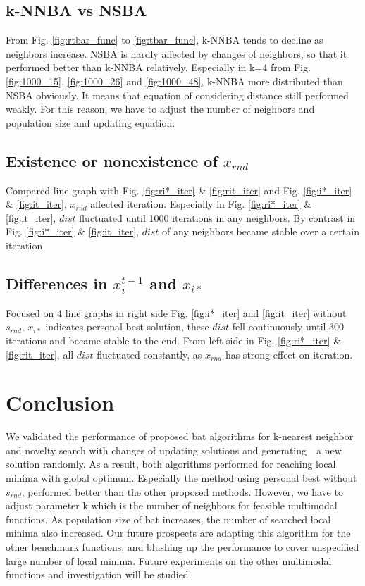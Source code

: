 \documentclass{ies2018}
\begin{document}
\subsection{k-NNBA vs NSBA}
From Fig. \ref{fig:rtbar_func} to \ref{fig:tbar_func}, k-NNBA tends to decline as neighbors increase. NSBA is hardly affected by changes of neighbors, so that it performed better than k-NNBA relatively. Especially in k=4 from Fig. \ref{fig:1000_15}, \ref{fig:1000_26} and \ref{fig:1000_48}, k-NNBA more distributed than NSBA obviously. It means that equation of considering distance still performed weakly. For this reason, we have to adjust the number of neighbors and population size and updating equation.
  
\subsection{Existence or nonexistence of ${x_{rnd}}$}
Compared line graph with Fig. \ref{fig:ri*_iter} \& \ref{fig:rit_iter} and Fig. \ref{fig:i*_iter} \& \ref{fig:it_iter}, ${x_{rnd}}$ affected iteration. Especially in Fig. \ref{fig:ri*_iter} \& \ref{fig:it_iter}, ${dist}$ fluctuated until 1000 iterations in any neighbors. By contrast in Fig. \ref{fig:i*_iter} \& \ref{fig:it_iter}, ${dist}$ of any neighbors became stable over a certain iteration. 

\subsection{Differences in ${x_i^{t-1}}$ and ${x_{i*}}$}
Focused on 4 line graphs in right side Fig. \ref{fig:i*_iter} and \ref{fig:it_iter} without ${s_{rnd}}$, ${x_{i*}}$ indicates personal best solution, these ${dist}$ fell continuously until 300 iterations and became stable to the end. From left side in Fig. \ref{fig:ri*_iter} \& \ref{fig:rit_iter}, all ${dist}$ fluctuated constantly, as ${x_{rnd}}$ has strong effect on iteration.

\section{Conclusion}
We validated the performance of proposed bat algorithms for k-nearest neighbor and novelty search with changes of updating solutions and generating　a new solution randomly. As a result, both algorithms performed for reaching local minima with global optimum. Especially the method using personal best without ${s_{rnd}}$, performed better than the other proposed methods. However, we have to adjust parameter k which is the number of neighbors for feasible multimodal functions. As population size of bat increases, the number of searched local minima  also increased. Our future prospects are adapting this algorithm for the other benchmark functions, and blushing up the performance to cover unspecified large number of local minima. Future experiments on the other multimodal functions and investigation will be studied.
\end{document}
